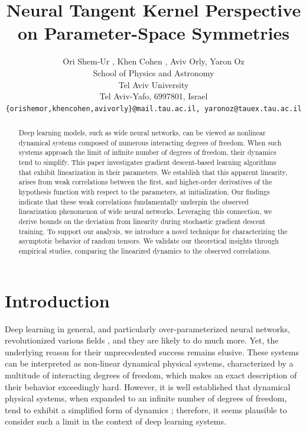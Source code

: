 \documentclass{article} %
\title{Neural Tangent Kernel Perspective on Parameter-Space Symmetries}
\author{
Ori Shem-Ur , Khen Cohen , Aviv Orly, Yaron Oz \\
School of Physics and Astronomy \\
Tel Aviv University \\
Tel Aviv-Yafo, 6997801, Israel \\
\texttt{\{orishemor,khencohen,avivorly\}@mail.tau.ac.il, yaronoz@tauex.tau.ac.il}
}
\begin{document}
\maketitle

\begin{abstract}
{Deep learning models, such as wide neural networks, can be viewed as nonlinear dynamical systems composed of numerous interacting degrees of freedom. When such systems approach the limit of infinite number of degrees of freedom, their dynamics tend to simplify. This paper investigates gradient descent-based learning algorithms that exhibit linearization in their parameters. We establish that this apparent linearity, arises from weak correlations between the first, and higher-order derivatives of the hypothesis function with respect to the parameters, at initialization. Our findings indicate that these weak correlations fundamentally underpin the observed linearization phenomenon of wide neural networks. Leveraging this connection, we derive bounds on the deviation from linearity during stochastic gradient descent training. To support our analysis, we introduce a novel technique for characterizing the asymptotic behavior of random tensors. We validate our theoretical insights through empirical studies, comparing the linearized dynamics to the observed correlations.}
\end{abstract}

\section{Introduction}
\label{sec:intro}

Deep learning in general, and particularly over-parameterized neural networks, revolutionized various fields \cite{SpeechRecognition2013,
DeepImageRecognition2016,
ImagenetClassificationNN2012,
MasteringGo2016}, and they are likely to do much more. Yet, the underlying reason for their unprecedented success remains elusive. These systems can be interpreted as non-linear dynamical physical systems, characterized by a multitude of interacting degrees of freedom, which makes an exact description of their behavior exceedingly hard. However, it is well established that dynamical physical systems, when expanded to an infinite number of degrees of freedom\textcolor{black}{,} tend to exhibit a simplified form of dynamics \cite{More_Is_Different}; therefore, it seems plausible to consider such a limit in the context of deep learning systems.
\end{document}
